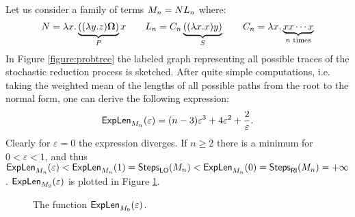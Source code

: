 \begin{example}\label{example:nontr}
	Let us consider a family of terms $M_n=NL_n$ where:
	$$
	N = \lambda x.\underbrace{((\lambda y.z)\bm{\Omega})}_P x\qquad
	L_n = C_n\underbrace{((\lambda x.x)y)}_S\qquad
	C_n = \lambda  x.\underbrace{xx\cdots x}_{n\text{ times}}
	$$
	In Figure \ref{figure:probtree} the labeled graph representing all possible traces of the stochastic reduction process is sketched. After quite simple computations, i.e. taking the weighted mean of the lengths of all possible paths from the root to the normal form, one can derive the following expression: 
	$$
	\textsf{ExpLen}_{M_n}(\varepsilon)=(n-3)\varepsilon^3+4\varepsilon^2+\frac{2}{\varepsilon}.
	$$
	Clearly for $\varepsilon=0$ the expression diverges. If $n\geq 2$ there is a minimum for $0<\varepsilon<1$, and thus $\textsf{ExpLen}_{M_n}(\varepsilon) <\textsf{ExpLen}_{M_n}(1)=\textsf{Steps}_{\textsf{LO}}(M_n) <\textsf{ExpLen}_{M_n}(0)= \textsf{Steps}_{\textsf{RI}}(M_n)=+\infty$. $\textsf{ExpLen}_{M_9}(\varepsilon)$ is plotted in Figure \ref{figure:plot}.
	\begin{figure}
		\caption{The function $\textsf{ExpLen}_{M_9}(\varepsilon)$.}
		\label{figure:plot}
	\end{figure}
\end{example}
